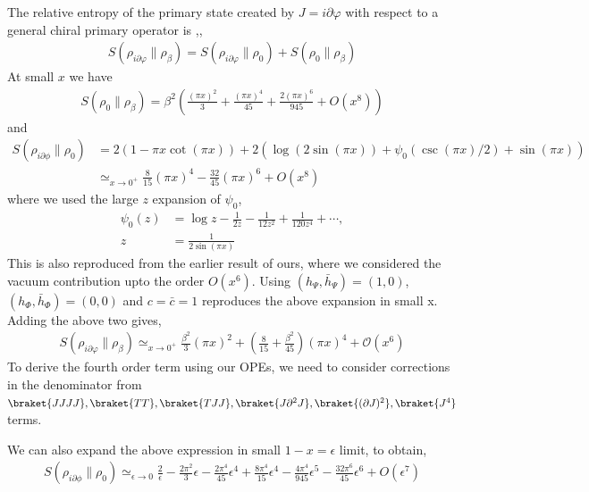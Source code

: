 \documentclass[11pt]{article}
\newcommand{\ep}{\epsilon}
\newcommand{\p}{\partial}
\newcommand{\mO}{\mathcal{O}}
\newcommand{\nn}{\nonumber}
\newcommand{\lb}{\left(}
\newcommand{\rb}{\right)}
\begin{document}
  The relative entropy of the primary state created by $J=i\p\varphi$ with respect to a general chiral primary operator is \cite{Calabrese_2014},\cite{Essler_2013},\cite{Nakagawa_2017}
  \begin{align}
  S(\rho_{i\p\varphi}\|\rho_\beta)=S(\rho_{i\p\varphi}\|\rho_0)+S(\rho_0\|\rho_\beta)
  \end{align}
At small $x$ we have
  \begin{align}
      S(\rho_0\| \rho_\beta) = \beta^2\lb \frac{(\pi x)^2}{3} + \frac{(\pi x)^4}{45}+\frac{2(\pi x)^6}{945} + O(x^8)\rb
  \end{align}
  and
  \begin{align}
      S(\rho_{i\partial\phi}\|\rho_0)&=2(1-\pi x \cot(\pi x))+2\lb \log(2\sin(\pi x))+\psi_0(\csc(\pi x)/2)+\sin(\pi x)\rb\nn\\
      &\simeq_{x \to 0^+} \frac{8}{15}(\pi x)^4 -\frac{32}{45}\lb \pi x \rb^6  + O(x^8)
  \end{align}
  where we used the large $z$ expansion of $\psi_0$,
  \begin{align}
      \psi_0(z) &= \log z - \frac{1}{2z} - \frac{1}{12z^2} + \frac{1}{120z^4} + \cdots, \\ 
      z &= \frac{1}{2\sin(\pi x)}
  \end{align}
  This is also reproduced from the earlier result of ours, where we considered the vacuum contribution upto the order $O(x^6)$. Using  $(h_\Psi,\bar h_\Psi) = (1,0)$, $(h_\Phi,\bar h_\Phi) = (0,0)$ and $c = \bar c = 1$ reproduces the above expansion in small x.
  Adding the above two gives,
  \begin{align}
      S(\rho_{i\p \varphi}\| \rho_\beta) \simeq_{x \to 0^+} \frac{\beta^2}{3}(\pi x)^2 + \lb\frac{8}{15} + \frac{\beta^2}{45}\rb(\pi x)^4 + \mO(x^6)
  \end{align}
  To derive the fourth order term using our OPEs, we need to consider corrections in the denominator from $\braket{JJJJ}, \braket{TT},\braket{TJJ}, \braket{J \p^2 J}, \braket{(\p J)^2}, \braket{J^4}$ terms. 

We can also expand the above expression in small $1-x = \ep$ limit, to obtain,
\begin{align}
    S(\rho_{i\p \phi}\| \rho_0) \simeq_{\ep\to 0} \frac{2}{\ep} - \frac{2\pi^2}{3}\ep - \frac{2\pi^4}{45}\ep^4 + \frac{8\pi^4}{15}\ep^4 - \frac{4\pi^4}{945}\ep^5 - \frac{32\pi^6}{45}\ep^6 + O(\ep^7)
\end{align}
\end{document}
